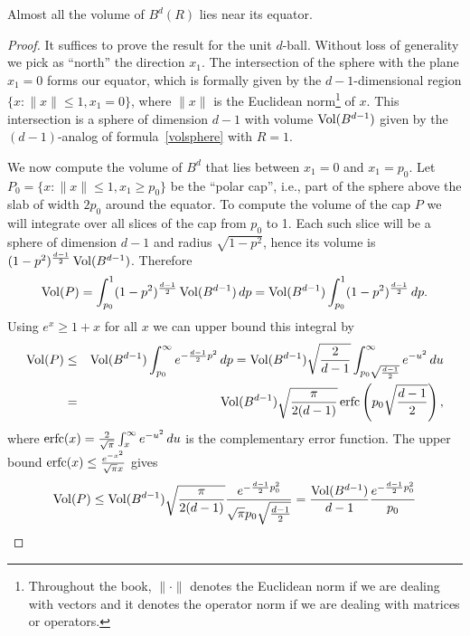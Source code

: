 \begin{fact}\label{fact:spheremostlyinequator}
Almost all the volume of $B^d(R)$ lies near its equator.
\end{fact}


\begin{proof}
It suffices to prove the result for the unit $d$-ball.
Without loss of generality we pick as ``north'' the direction $x_1$. The intersection of the sphere with the plane $x_1=0$  forms our equator, which is formally given by the $d-1$-dimensional region
$\{x: \|x\| \le 1, x_1=0\}$, where $\|x\|$ is the Euclidean norm\footnote{Throughout the book,  $\|\cdot \|$ denotes the Euclidean norm if we are dealing with vectors and it denotes the operator norm if we are dealing with matrices or operators.} of $x$. This intersection is a sphere of dimension $d-1$ with volume $\operatorname{Vol}(B^{d-1})$ given by
the $(d-1)$-analog of formula~\eqref{volsphere} with $R=1$.

We now compute the volume of $B^d$ that lies between $x_1=0$ and $x_1=p_0$.
Let $P_0=\{x: \|x\|\le 1, x_1\ge p_0\}$ be the ``polar cap'', i.e., part of the sphere above the slab of width $2p_0$ around the equator.
To compute the volume of the cap $P$ we will integrate over all slices of the cap from $p_0$ to 1.  
Each such slice will be a sphere of dimension $d-1$ and radius $\sqrt{1-p^2}$, hence its  volume is
$(1-p^2)^{\frac{d-1}{2}} \operatorname{Vol}(B^{d-1})$. Therefore
$$\operatorname{Vol}(P) = \int_{p_0}^1 (1-p^2)^{\frac{d-1}{2}} \operatorname{Vol}(B^{d-1}) \, dp = \operatorname{Vol}(B^{d-1})   \int_{p_0}^1 (1-p^2)^{\frac{d-1}{2}} \, dp.$$
Using $e^x \ge 1+x$ for all $x$ we can upper bound  this integral by
\begin{eqnarray*}
\operatorname{Vol}(P) &\le& \operatorname{Vol}(B^{d-1}) \int_{p_0}^\infty e^{-\frac{d-1}{2}p^2} \, dp = \operatorname{Vol}(B^{d-1})\sqrt{\frac{2}{d-1}} \int_{p_0 \sqrt{\frac{d-1}{2}}}^{\infty} e^{-u^2}\,du \\
&=& \operatorname{Vol}(B^{d-1}) \sqrt{\frac{\pi}{2(d-1)}}\operatorname{erfc}\left(p_0 \sqrt{\frac{d-1}{2}} \right),
\end{eqnarray*}
where $\operatorname{erfc}(x) = \frac{2}{\sqrt{\pi}}\int_x^{\infty} e^{-u^2}\,du$ is the complementary error function. The upper bound $\operatorname{erfc}(x) \leq \frac{e^{-x^2}}{\sqrt{\pi} x}$ gives
\begin{equation}\label{eq:chapter2:volBvolP:1}
\operatorname{Vol}(P) \le \operatorname{Vol}(B^{d-1}) \sqrt{\frac{\pi}{2(d-1)}}\frac{e^{- \frac{d-1}{2}p_0^2}}{\sqrt{\pi} p_0 \sqrt{\frac{d-1}{2}}} =  \frac{\operatorname{Vol}(B^{d-1})}{d-1}\frac{e^{- \frac{d-1}{2}p_0^2}}{ p_0}
\end{equation}





\end{proof}
